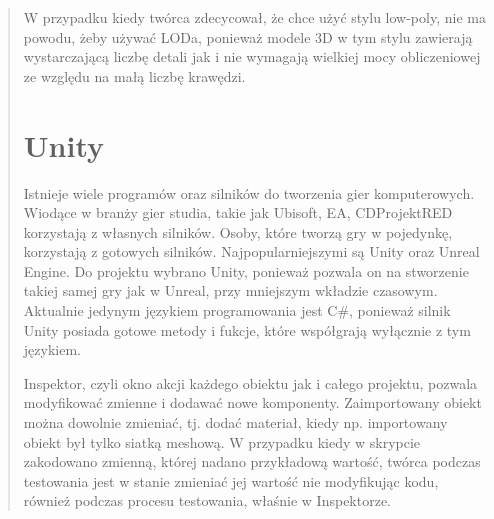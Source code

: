\begin{quotation}
\newpage
\indent W przypadku kiedy twórca zdecycował, że chce użyć stylu low-poly, nie ma powodu, żeby używać LODa, ponieważ modele 3D w tym stylu zawierają wystarczającą liczbę detali jak i nie wymagają wielkiej mocy obliczeniowej ze względu na małą liczbę krawędzi.

\section{Unity}

\indent Istnieje wiele programów oraz silników do tworzenia gier komputerowych. Wiodące w branży gier studia, takie jak Ubisoft, EA, CDProjektRED korzystają z własnych silników. Osoby, które tworzą gry w pojedynkę, korzystają z gotowych silników. Najpopularniejszymi są Unity oraz Unreal Engine. Do projektu wybrano Unity, ponieważ pozwala on na stworzenie takiej samej gry jak w Unreal, przy mniejszym wkładzie czasowym. Aktualnie jedynym językiem programowania jest C\#, ponieważ silnik Unity posiada gotowe metody i fukcje, które współgrają wyłącznie z tym językiem.

\indent Inspektor, czyli okno akcji każdego obiektu jak i całego projektu, pozwala modyfikować zmienne i dodawać nowe komponenty. Zaimportowany obiekt można dowolnie zmieniać, tj. dodać materiał, kiedy np. importowany obiekt był tylko siatką meshową. W przypadku kiedy w skrypcie zakodowano zmienną, której nadano przykładową wartość, twórca podczas testowania jest w stanie zmieniać jej wartość nie modyfikując kodu, również podczas procesu testowania, właśnie w Inspektorze. 

\end{quotation}
